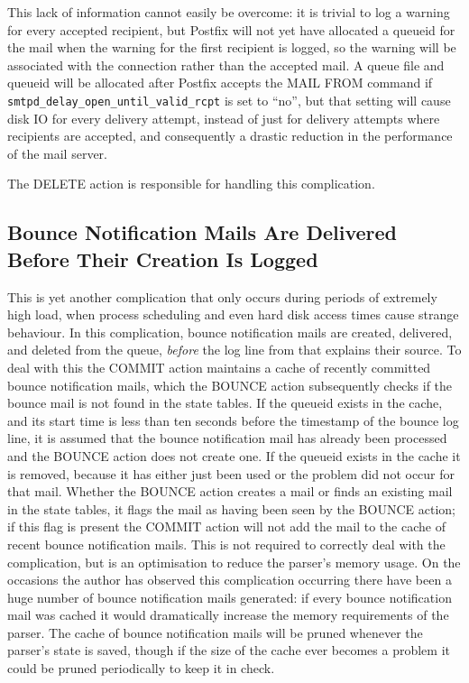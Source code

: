 This lack of information cannot easily be overcome: it is trivial to log a
warning for every accepted recipient, but Postfix will not yet have
allocated a queueid for the mail when the warning for the first recipient
is logged, so the warning will be associated with the connection rather
than the accepted mail.  A queue file and queueid will be allocated after
Postfix accepts the MAIL FROM command if
\texttt{smtpd\_delay\_open\_until\_valid\_rcpt} is set to ``no'', but that
setting will cause disk IO for every delivery attempt, instead of just for
delivery attempts where recipients are accepted, and consequently a drastic
reduction in the performance of the mail server.

The DELETE action is responsible for handling this complication.

\subsection{Bounce Notification Mails Are Delivered Before Their Creation
Is Logged}

\label{Bounce notification mails delivered before their creation is logged}

This is yet another complication that only occurs during periods of
extremely high load, when process scheduling and even hard disk access
times cause strange behaviour.  In this complication, bounce notification
mails are created, delivered, and deleted from the queue, \textit{before\/}
the log line from  that explains their source.  To deal with
this the COMMIT action maintains a cache of recently committed bounce
notification mails, which the BOUNCE action subsequently checks if the
bounce mail is not found in the state tables.  If the queueid exists in the
cache, and its start time is less than ten seconds before the timestamp of
the bounce log line, it is assumed that the bounce notification mail has
already been processed and the BOUNCE action does not create one.  If the
queueid exists in the cache it is removed, because it has either just been
used or the problem did not occur for that mail.  Whether the BOUNCE action
creates a mail or finds an existing mail in the state tables, it flags the
mail as having been seen by the BOUNCE action; if this flag is present the
COMMIT action will not add the mail to the cache of recent bounce
notification mails.  This is not required to correctly deal with the
complication, but is an optimisation to reduce the parser's memory usage.
On the occasions the author has observed this complication occurring there
have been a huge number of bounce notification mails generated: if every
bounce notification mail was cached it would dramatically increase the
memory requirements of the parser.  The cache of bounce notification mails
will be pruned whenever the parser's state is saved, though if the size of
the cache ever becomes a problem it could be pruned periodically to keep it
in check.

